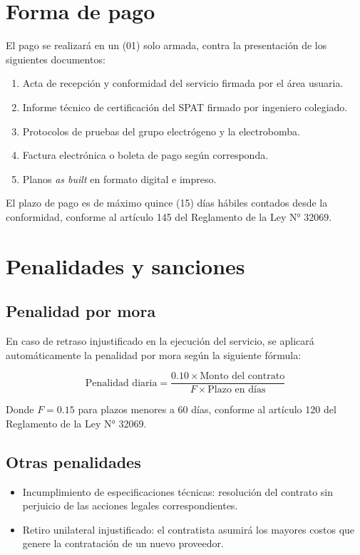 \documentclass[12pt,a4paper]{article}
\begin{document}
\section{Forma de pago}

El pago se realizará en un (01) solo armada, contra la presentación de los siguientes documentos:

\begin{enumerate}
  \item Acta de recepción y conformidad del servicio firmada por el área usuaria.
  \item Informe técnico de certificación del SPAT firmado por ingeniero colegiado.
  \item Protocolos de pruebas del grupo electrógeno y la electrobomba.
  \item Factura electrónica o boleta de pago según corresponda.
  \item Planos \emph{as built} en formato digital e impreso.
\end{enumerate}

El plazo de pago es de máximo quince (15) días hábiles contados desde la conformidad, conforme al artículo 145 del Reglamento de la Ley N° 32069.

\section{Penalidades y sanciones}

\subsection{Penalidad por mora}

En caso de retraso injustificado en la ejecución del servicio, se aplicará automáticamente la penalidad por mora según la siguiente fórmula:

\[
\text{Penalidad diaria} = \frac{0.10 \times \text{Monto del contrato}}{F \times \text{Plazo en días}}
\]

Donde $F = 0.15$ para plazos menores a 60 días, conforme al artículo 120 del Reglamento de la Ley N° 32069.

\subsection{Otras penalidades}

\begin{itemize}
  \item Incumplimiento de especificaciones técnicas: resolución del contrato sin perjuicio de las acciones legales correspondientes.
  \item Retiro unilateral injustificado: el contratista asumirá los mayores costos que genere la contratación de un nuevo proveedor.
\end{itemize}
\end{document}

